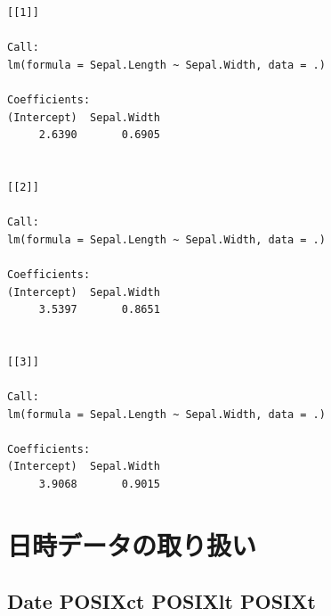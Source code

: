 \documentclass[
  letterpaper,
  DIV=11,
  numbers=noendperiod]{scrreprt}
\begin{document}
\begin{verbatim}
[[1]]

Call:
lm(formula = Sepal.Length ~ Sepal.Width, data = .)

Coefficients:
(Intercept)  Sepal.Width  
     2.6390       0.6905  


[[2]]

Call:
lm(formula = Sepal.Length ~ Sepal.Width, data = .)

Coefficients:
(Intercept)  Sepal.Width  
     3.5397       0.8651  


[[3]]

Call:
lm(formula = Sepal.Length ~ Sepal.Width, data = .)

Coefficients:
(Intercept)  Sepal.Width  
     3.9068       0.9015  
\end{verbatim}


\hypertarget{ux65e5ux6642ux30c7ux30fcux30bfux306eux53d6ux308aux6271ux3044}{%
\chapter{日時データの取り扱い}\label{ux65e5ux6642ux30c7ux30fcux30bfux306eux53d6ux308aux6271ux3044}}

\hypertarget{date-posixct-posixlt-posixt}{%
\section{Date POSIXct POSIXlt
POSIXt}\label{date-posixct-posixlt-posixt}}
\end{document}
